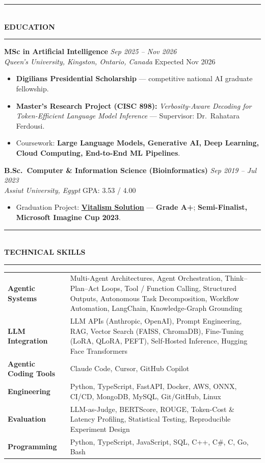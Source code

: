 \documentclass[10pt, a4paper]{article}
\newcommand{\cvsection}[1]{%
  \vspace{3pt}%
  {\color{navy}\rule{\linewidth}{1.1pt}}\\[0.5pt]%
  {\color{navy}\bfseries\fontsize{9.5}{11}\selectfont\uppercase{#1}}\\[-4pt]%
  {\color{teal}\rule{\linewidth}{0.6pt}}%
  \vspace{2pt}%
}
\newcommand{\cventry}[4]{%
  \vspace{2.5pt}%
  \textbf{\color{darkgray}#1} \hfill {\color{midgray}\textit{#3}}\\[-1.5pt]%
  {\color{teal}\textit{#2}} \hfill {\color{midgray}#4}%
}
\newenvironment{cvitems}{%
  \begin{itemize}[leftmargin=11pt, itemsep=0.5pt, parsep=0pt, topsep=1pt,
                  label={\textcolor{teal}{$\bullet$}}]
}{%
  \end{itemize}%
}
\begin{document}
\cvsection{Education}

\cventry{MSc in Artificial Intelligence}{Queen's University, Kingston, Ontario, Canada}
        {Sep 2025 -- Nov 2026}{Expected Nov 2026}
\begin{cvitems}
  \item \textbf{Digilians Presidential Scholarship} --- competitive national AI graduate fellowship.
  \item \textbf{Master's Research Project (CISC 898):} \textit{Verbosity-Aware Decoding for Token-Efficient Language Model Inference} --- Supervisor: Dr.\ Rahatara Ferdousi.
  \item Coursework: \textbf{Large Language Models, Generative AI, Deep Learning, Cloud Computing, End-to-End ML Pipelines}.
\end{cvitems}

\cventry{B.Sc.\ Computer \& Information Science (Bioinformatics)}{Assiut University, Egypt}
        {Sep 2019 -- Jul 2023}{GPA: 3.53 / 4.00}
\begin{cvitems}
  \item Graduation Project: \href{https://vitalismsolution.github.io/}{\textbf{Vitalism Solution}} --- \textbf{Grade A+}; \textbf{Semi-Finalist, Microsoft Imagine Cup 2023}.
\end{cvitems}

\cvsection{Technical Skills}

\renewcommand{\arraystretch}{1.1}
\begin{tabularx}{\linewidth}{@{}>{\raggedright\hyphenpenalty=10000\arraybackslash}p{35mm} X@{}}
\textbf{Agentic Systems} &
Multi-Agent Architectures, Agent Orchestration, Think--Plan--Act Loops, Tool / Function Calling, Structured Outputs, Autonomous Task Decomposition, Workflow Automation, LangChain, Knowledge-Graph Grounding \\

\textbf{LLM Integration} &
LLM APIs (Anthropic, OpenAI), Prompt Engineering, RAG, Vector Search (FAISS, ChromaDB), Fine-Tuning (LoRA, QLoRA, PEFT), Self-Hosted Inference, Hugging Face Transformers \\

\textbf{Agentic Coding Tools} &
Claude Code, Cursor, GitHub Copilot \\

\textbf{Engineering} &
Python, TypeScript, FastAPI, Docker, AWS, ONNX, CI/CD, MongoDB, MySQL, Git/GitHub, Linux \\

\textbf{Evaluation} &
LLM-as-Judge, BERTScore, ROUGE, Token-Cost \& Latency Profiling, Statistical Testing, Reproducible Experiment Design \\

\textbf{Programming} &
Python, TypeScript, JavaScript, SQL, C++, C\#, C, Go, Bash \\
\end{tabularx}
\end{document}
